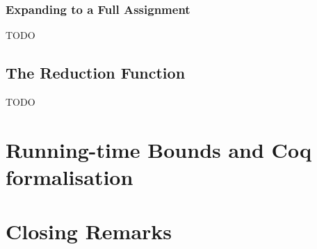 \documentclass[a4paper,UKenglish,cleveref, autoref]{lipics-v2019}
\begin{document}
\subsubsection{Expanding to a Full Assignment}
TODO

\subsection{The Reduction Function}
TODO

\section{Running-time Bounds and Coq formalisation}

\section{Closing Remarks}
\end{document}
